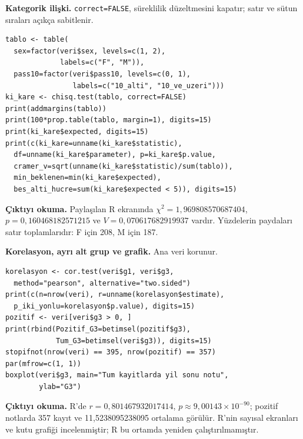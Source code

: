 \par\noindent\begin{minipage}{\linewidth}
\textbf{Kategorik ilişki.} \texttt{correct=FALSE}, süreklilik
düzeltmesini kapatır; satır ve sütun sıraları açıkça sabitlenir.

\begin{lstlisting}[style=prismR]
tablo <- table(
  sex=factor(veri$sex, levels=c(1, 2),
             labels=c("F", "M")),
  pass10=factor(veri$pass10, levels=c(0, 1),
                labels=c("10_alti", "10_ve_uzeri")))
ki_kare <- chisq.test(tablo, correct=FALSE)
print(addmargins(tablo))
print(100*prop.table(tablo, margin=1), digits=15)
print(ki_kare$expected, digits=15)
print(c(ki_kare=unname(ki_kare$statistic),
  df=unname(ki_kare$parameter), p=ki_kare$p.value,
  cramer_v=sqrt(unname(ki_kare$statistic)/sum(tablo)),
  min_beklenen=min(ki_kare$expected),
  bes_alti_hucre=sum(ki_kare$expected < 5)), digits=15)
\end{lstlisting}

\textbf{Çıktıyı okuma.} Paylaşılan R ekranında
$\chi^2=1{,}969808570687404$, $p=0{,}160468182571215$ ve
$V=0{,}070617682919937$ vardır. Yüzdelerin paydaları satır
toplamlarıdır: F için 208, M için 187.
\end{minipage}\par

\par\noindent\begin{minipage}{\linewidth}
\textbf{Korelasyon, ayrı alt grup ve grafik.} Ana veri korunur.

\begin{lstlisting}[style=prismR]
korelasyon <- cor.test(veri$g1, veri$g3,
  method="pearson", alternative="two.sided")
print(c(n=nrow(veri), r=unname(korelasyon$estimate),
  p_iki_yonlu=korelasyon$p.value), digits=15)
pozitif <- veri[veri$g3 > 0, ]
print(rbind(Pozitif_G3=betimsel(pozitif$g3),
            Tum_G3=betimsel(veri$g3)), digits=15)
stopifnot(nrow(veri) == 395, nrow(pozitif) == 357)
par(mfrow=c(1, 1))
boxplot(veri$g3, main="Tum kayitlarda yil sonu notu",
        ylab="G3")
\end{lstlisting}

\textbf{Çıktıyı okuma.} R'de $r=0{,}801467932017414$,
$p\approx9{,}00143\times10^{-90}$; pozitif notlarda 357 kayıt ve
11,5238095238095 ortalama görülür. R'nin sayısal ekranları ve kutu
grafiği incelenmiştir; R bu ortamda yeniden çalıştırılmamıştır.
\end{minipage}\par

